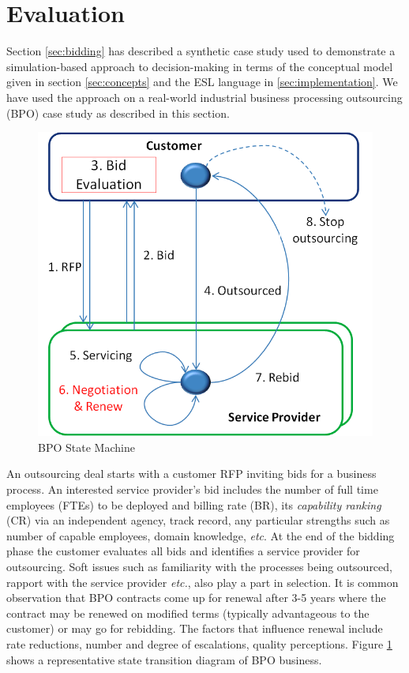 \documentclass[10pt,numbers]{sigplanconf}
\begin{document}
\section{Evaluation}

\label{sec:evaluation}

Section \ref{sec:bidding} has described a synthetic case study used to demonstrate a simulation-based approach to decision-making in terms of the conceptual model given in section \ref{sec:concepts} and the ESL language in \ref{sec:implementation}. We have used the approach on a real-world industrial business processing outsourcing (BPO) case study as described in this section.

\begin{figure}[t]
\centering
\includegraphics[width=0.75\columnwidth]{sm}
\caption{BPO State Machine}
\label{fig:BPO_state_machine}
\end{figure}

An outsourcing deal starts with a customer RFP inviting bids for a business process. An interested service provider's bid includes the number of full time employees (FTEs) to be deployed and billing rate (BR), its {\it capability ranking} (CR) via an independent agency, track record, any particular strengths such as number of capable employees, domain knowledge, {\it etc}. At the end of the bidding phase the customer evaluates all bids and identifies a service provider for outsourcing. Soft issues such as familiarity with the processes being outsourced, rapport with the service provider {\it etc.}, also play a part in selection. It is common observation that BPO contracts come up for renewal after 3-5 years where the contract may be renewed on modified terms (typically advantageous to the customer) or may go for rebidding. The factors that influence renewal include rate reductions, number and degree of escalations, quality perceptions. Figure \ref{fig:BPO_state_machine} shows a representative state transition diagram of BPO business.
\end{document}

